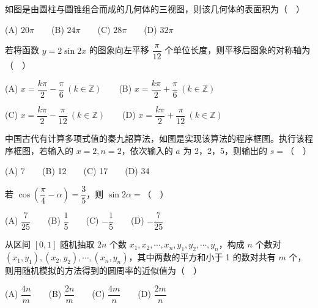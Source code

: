 \begin{question}
如图是由圆柱与圆锥组合而成的几何体的三视图，则该几何体的表面积为（　）
\nopagebreak[4]
\begin{center}\end{center}
\nopagebreak[4]
   (A) \(20\pi\)　　(B) \(24\pi\)　　(C) \(28\pi\)　　(D) \(32\pi\)

\end{question}
\begin{question}
若将函数 \(y=2\sin 2x\) 的图象向左平移 \(\dfrac{\pi}{12}\) 个单位长度，则平移后图象的对称轴为（　）

   (A) \(x=\dfrac{k\pi}{2}-\dfrac{\pi}{6}\ (k\in\mathbb Z)\)　　(B) \(x=\dfrac{k\pi}{2}+\dfrac{\pi}{6}\ (k\in\mathbb Z)\)

   (C) \(x=\dfrac{k\pi}{2}-\dfrac{\pi}{12}\ (k\in\mathbb Z)\)　　(D) \(x=\dfrac{k\pi}{2}+\dfrac{\pi}{12}\ (k\in\mathbb Z)\)

\Needspace{0.4\textheight}
\end{question}
\begin{question}
中国古代有计算多项式值的秦九韶算法，如图是实现该算法的程序框图。执行该程序框图，若输入的 \(x=2,n=2\)，依次输入的 \(a\) 为 2，2，5，则输出的 \(s=\)（　）
\nopagebreak[4]
\begin{center}\end{center}
\nopagebreak[4]
   (A) 7　　(B) 12　　(C) 17　　(D) 34

\end{question}
\begin{question}
若 \(\cos\left(\dfrac\pi4-\alpha\right)=\dfrac35\)，则 \(\sin 2\alpha=\)（　）

   (A) \(\dfrac7{25}\)　　(B) \(\dfrac15\)　　(C) \(-\dfrac15\)　　(D) \(-\dfrac7{25}\)

\end{question}
\begin{question}
从区间 \([0,1]\) 随机抽取 \(2n\) 个数 \(x_1,\allowbreak x_2,\allowbreak\cdots,\allowbreak x_n,\allowbreak y_1,\allowbreak y_2,\allowbreak\cdots,\allowbreak y_n\)，构成 \(n\) 个数对 \((x_1,y_1),\allowbreak(x_2,y_2),\allowbreak\cdots,\allowbreak(x_n,y_n)\)，其中两数的平方和小于 1 的数对共有 \(m\) 个，则用随机模拟的方法得到的圆周率的近似值为（　）

   (A) \(\dfrac{4n}{m}\)　　(B) \(\dfrac{2n}{m}\)　　(C) \(\dfrac{4m}{n}\)　　(D) \(\dfrac{2m}{n}\)

\end{question}
